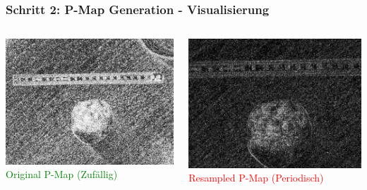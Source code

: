 \documentclass[11pt,t,usepdftitle=false,aspectratio=169]{beamer}
\begin{document}
\begin{frame}
	\frametitle{Schritt 2: P-Map Generation - Visualisierung}

	\begin{columns}[T]
		\begin{column}{0.48\textwidth}
			\includegraphics[width=\textwidth]{images/examples_unedited/p_map.png}
			\textcolor{green}{\small Original P-Map (Zufällig)}
		\end{column}
		\begin{column}{0.48\textwidth}
			\includegraphics[width=\textwidth]{images/examples_edited/p_map.png}
			\textcolor{red}{\small Resampled P-Map (Periodisch)}
		\end{column}
	\end{columns}
\end{frame}
\end{document}
